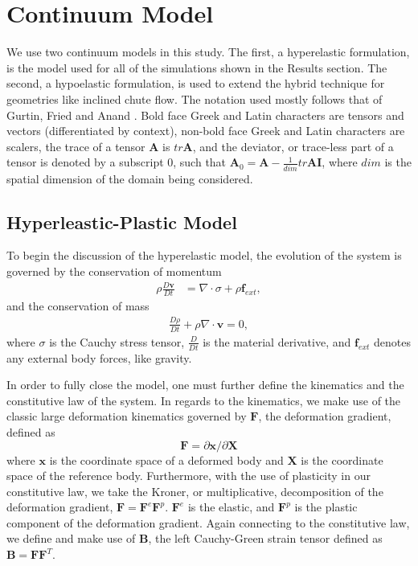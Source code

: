 \def\b_p{\bm{B}^{e,p}}
\chapter{Continuum Model}
We use two continuum models in this study. The first, a hyperelastic formulation, is the model used for all of the simulations shown in the Results section. The second, a hypoelastic formulation, is used to extend the hybrid technique for geometries like inclined chute flow. The notation used mostly follows that of Gurtin, Fried and Anand \cite{Gurtin10}. Bold face Greek and Latin characters are tensors and vectors (differentiated by context), non-bold face Greek and Latin characters are scalers, the trace of a tensor $\bm{A}$ is $tr\bm{A}$, and the deviator, or trace-less part of a tensor is denoted by a subscript 0, such that $\bm{A}_0=\bm{A}-\frac{1}{dim}tr{\bm{A}}\bm{I}$, where $dim$ is the spatial dimension of the domain being considered.

\section{Hyperleastic-Plastic Model} \label{hyperelastic_model}
To begin the discussion of the hyperelastic model, the evolution of the system is governed by the conservation of momentum
\begin{align}
\rho \frac{D \bm{v}}{D t} &= \nabla \cdot \sigma + \rho \bm{f}_{ext} ,
\end{align}
and the conservation of mass
\begin{align}
\frac{D \rho}{D t} + \rho \nabla \cdot \bm{v} = 0 ,
\end{align}
where $\sigma$ is the Cauchy stress tensor, $\frac{D}{D t}$ is the material derivative, and $\bm{f}_{ext}$ denotes any external body forces, like gravity. 

In order to fully close the model, one must further define the kinematics and the constitutive law of the system. In regards to the kinematics, we make use of the classic large deformation kinematics governed by $\bm{F}$, the deformation gradient, defined as
\begin{equation}
\bm{F}=\partial\bm{x}/\partial\bm{X}
\end{equation}
where $\bm{x}$ is the coordinate space of a deformed body and $\bm{X}$ is the coordinate space of the reference body. Furthermore, with the use of plasticity in our constitutive law, we take the Kroner, or multiplicative, decomposition of the deformation gradient, $\bm{F}=\bm{F}^e\bm{F}^p$. $\bm{F}^e$ is the elastic, and $\bm{F}^p$ is the plastic component of the deformation gradient. Again connecting to the constitutive law, we define and make use of $\bm{B}$, the left Cauchy-Green strain tensor defined as $\bm{B}=\bm{F}\bm{F}^T$. 

